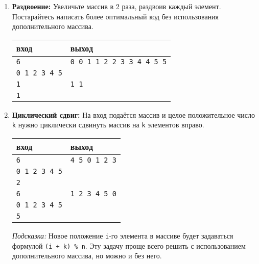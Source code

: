 \documentclass[10pt]{article}
\begin{document}
\begin{enumerate}
\item \textbf{Раздвоение:} Увеличьте массив в 2 раза, раздвоив каждый элемент. Постарайтесь написать более оптимальный код без использования дополнительного массива.
\begin{center}
\begin{tabular}{ l | l }
 вход & выход \\ \hline
 \texttt{6} & \texttt{0 0 1 1 2 2 3 3 4 4 5 5}  \\  
 \texttt{0 1 2 3 4 5} & \\ \hline
 \texttt{1} & \texttt{1 1}  \\  
 \texttt{1} &  \\
\end{tabular}
\end{center}
\item \textbf{Циклический сдвиг:} На вход подаётся массив и целое положительное число \texttt{k} нужно циклически сдвинуть массив на \texttt{k} элементов вправо.
\begin{center}
\begin{tabular}{ l | l }
 вход & выход \\ \hline
 \texttt{6} & \texttt{4 5 0 1 2 3}  \\  
 \texttt{0 1 2 3 4 5} & \\
 \texttt{2} & \\ \hline
 \texttt{6} & \texttt{1 2 3 4 5 0}  \\  
 \texttt{0 1 2 3 4 5} & \\
 \texttt{5} & \\ 
\end{tabular}
\end{center}
\textit{Подсказка:} Новое положение \texttt{i}-го элемента в массиве будет задаваться формулой \texttt{(i + k) \% n}. Эту задачу проще всего решить с использованием дополнительного массива, но можно и без него.
\end{enumerate}
\end{document}
